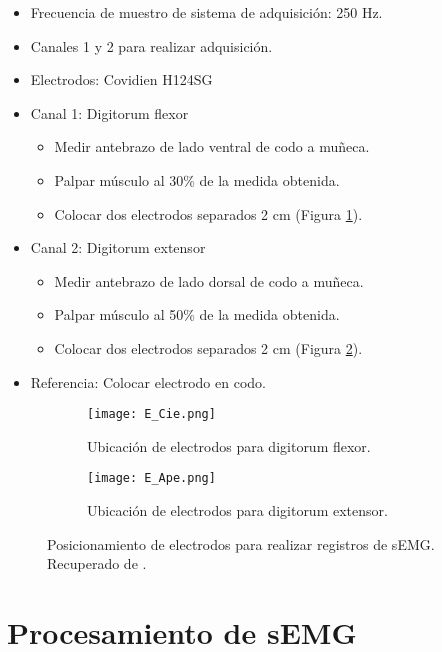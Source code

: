 \begin{itemize}
	\item Frecuencia de muestro de sistema de adquisición: 250 Hz.
	\item Canales 1 y 2 para realizar adquisición.
	\item Electrodos: Covidien H124SG
	\item Canal 1: Digitorum flexor
	\begin{itemize}
		\item Medir antebrazo de lado ventral de codo a muñeca.
		\item Palpar músculo al 30\% de la medida obtenida.
		\item Colocar dos electrodos separados 2 cm (Figura \ref{Figura: E_Cie}).
	\end{itemize}
	\item Canal 2: Digitorum extensor
	\begin{itemize}
		\item Medir antebrazo de lado dorsal de codo a muñeca.
		\item Palpar músculo al 50\% de la medida obtenida.
		\item Colocar dos electrodos separados 2 cm (Figura \ref{Figura: E_Ape}).
	\end{itemize}
	\item Referencia: Colocar electrodo en codo.
\end{itemize}

\begin{figure}[htbp]
	\centering
	\begin{subfigure}[htbp]{0.3\textwidth}
		\texttt{[image: E\_Cie.png]}
		\caption{Ubicación de electrodos para digitorum flexor.}
		\label{Figura: E_Cie}
	\end{subfigure}
	\hfill
	\begin{subfigure}[htbp]{0.3\textwidth}
		\texttt{[image: E\_Ape.png]}
		\caption{Ubicación de electrodos para digitorum extensor.}
		\label{Figura: E_Ape}
	\end{subfigure}
	\caption[Posicionamiento de electrodos para registro de sEMG]{Posicionamiento de electrodos para realizar registros de sEMG. Recuperado de \cite{Cavalcanti-Garcia2009}.}
	\label{Figura: E_sEMG}
\end{figure}

\section{Procesamiento de sEMG}

